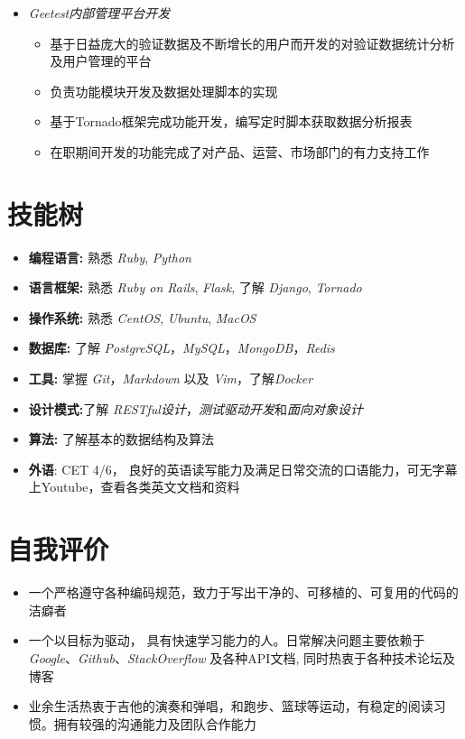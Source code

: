 \documentclass[11pt, a4paper,sans]{moderncv}     %
\begin{document}
\begin{itemize}
\begin{itemize}
    \item{\textit{Geetest内部管理平台开发}}
    \begin{itemize}
      \item {  基于日益庞大的验证数据及不断增长的用户而开发的对验证数据统计分析及用户管理的平台}
      \item {  负责功能模块开发及数据处理脚本的实现}
      \item {  基于Tornado框架完成功能开发，编写定时脚本获取数据分析报表}
      \item {  在职期间开发的功能完成了对产品、运营、市场部门的有力支持工作}
    \end{itemize}
  \end{itemize}

\end{itemize}
\vspace{-8pt}


\section{\yahei 技能树}
\begin{itemize}
  \item{\textbf{编程语言:} {熟悉 \textit{Ruby}, \textit{Python}}}
  \item{\textbf{语言框架:} {熟悉 \textit{Ruby on Rails}, \textit{Flask}, 了解 \textit{Django}, \textit{Tornado}}}%
  \item{\textbf{操作系统:} {熟悉 \textit{CentOS}, \textit{Ubuntu}, \textit{MacOS}}}%
  \item{\textbf{数据库:} {了解 \textit{PostgreSQL}，\textit{MySQL}，\textit{MongoDB}，\textit{Redis}}}%
  \item{\textbf{工具:} {掌握 \textit{Git}，\textit{Markdown} 以及 \textit{Vim}，了解\textit{Docker}}}%
  \item{\textbf{设计模式:}{了解 \textit{RESTful设计}，\textit{测试驱动开发}和\textit{面向对象设计}}}%
  \item{ \textbf{算法:} {了解基本的数据结构及算法}}%
  \item{\textbf{外语}: {CET 4/6， 良好的英语读写能力及满足日常交流的口语能力，可无字幕上Youtube，查看各类英文文档和资料} }
\end{itemize}
\vspace{-8pt}

\section{\yahei 自我评价}

\begin{itemize}
  \item{\yahei 一个严格遵守各种编码规范，致力于写出干净的、可移植的、可复用的代码的洁癖者}
  \item{\yahei 一个以目标为驱动， 具有快速学习能力的人。日常解决问题主要依赖于\textit{Google}、\textit{Github}、\textit{StackOverflow} 及各种API文档, 同时热衷于各种技术论坛及博客}
  \item{\yahei 业余生活热衷于吉他的演奏和弹唱，和跑步、篮球等运动，有稳定的阅读习惯。拥有较强的沟通能力及团队合作能力}
\end{itemize}
\end{document}
